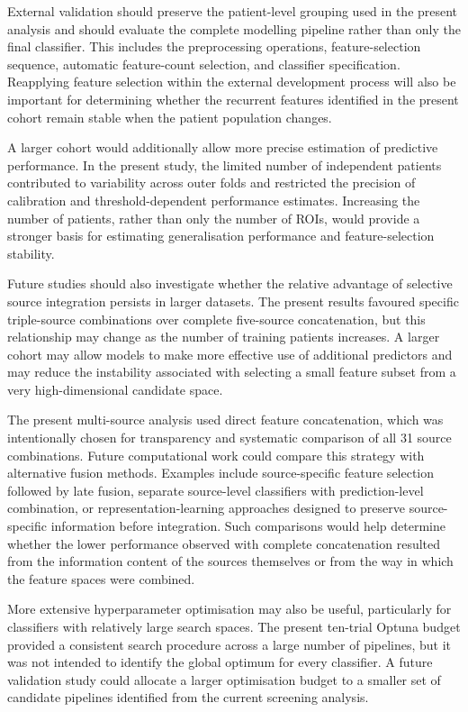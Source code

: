 \documentclass[12pt,twocolumn]{article}
\begin{document}
External validation should preserve the patient-level grouping used in
the present analysis and should evaluate the complete modelling
pipeline rather than only the final classifier. This includes the
preprocessing operations, feature-selection sequence, automatic
feature-count selection, and classifier specification. Reapplying
feature selection within the external development process will also be
important for determining whether the recurrent features identified
in the present cohort remain stable when the patient population
changes.

A larger cohort would additionally allow more precise estimation of
predictive performance. In the present study, the limited number of
independent patients contributed to variability across outer folds and
restricted the precision of calibration and threshold-dependent
performance estimates. Increasing the number of patients, rather than
only the number of ROIs, would provide a stronger basis for estimating
generalisation performance and feature-selection stability.

Future studies should also investigate whether the relative advantage
of selective source integration persists in larger datasets. The
present results favoured specific triple-source combinations over
complete five-source concatenation, but this relationship may change
as the number of training patients increases. A larger cohort may
allow models to make more effective use of additional predictors and
may reduce the instability associated with selecting a small feature
subset from a very high-dimensional candidate space.

The present multi-source analysis used direct feature concatenation,
which was intentionally chosen for transparency and systematic
comparison of all 31 source combinations. Future computational work
could compare this strategy with alternative fusion methods. Examples
include source-specific feature selection followed by late fusion,
separate source-level classifiers with prediction-level combination,
or representation-learning approaches designed to preserve
source-specific information before integration. Such comparisons
would help determine whether the lower performance observed with
complete concatenation resulted from the information content of the
sources themselves or from the way in which the feature spaces were
combined.

More extensive hyperparameter optimisation may also be useful,
particularly for classifiers with relatively large search spaces.
The present ten-trial Optuna budget provided a consistent search
procedure across a large number of pipelines, but it was not intended
to identify the global optimum for every classifier. A future
validation study could allocate a larger optimisation budget to a
smaller set of candidate pipelines identified from the current
screening analysis.
\end{document}
